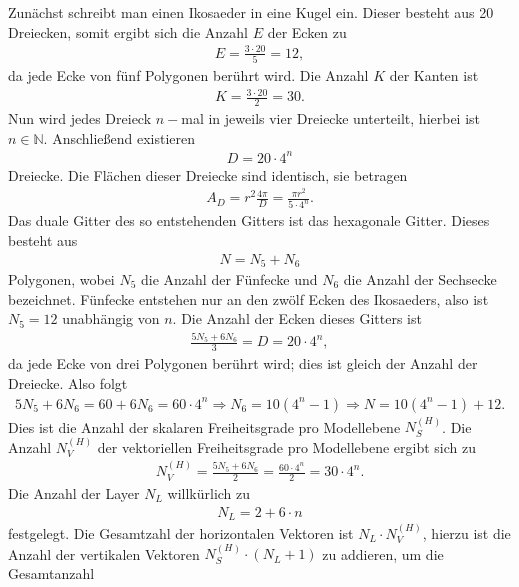 \documentclass{book}
\begin{document}
Zunächst schreibt man einen Ikosaeder in eine Kugel ein. Dieser besteht aus 20 Dreiecken, somit ergibt sich die Anzahl $E$ der Ecken zu
%
\begin{eqnarray}
E = \frac{3\cdot 20}{5} = 12, 
\end{eqnarray}
%
da jede Ecke von fünf Polygonen berührt wird. Die Anzahl $K$ der Kanten ist
%
\begin{eqnarray}
K = \frac{3\cdot 20}{2} = 30.
\end{eqnarray}
%
Nun wird jedes Dreieck $n-$mal in jeweils vier Dreiecke unterteilt, hierbei ist $n\in\mathbb{N}$. Anschließend existieren
%
\begin{eqnarray}
D = 20\cdot 4^n
\end{eqnarray}
%
Dreiecke. Die Flächen dieser Dreiecke sind identisch, sie betragen
%
\begin{eqnarray}
A_D = r^2\frac{4\pi}{D} = \frac{\pi r^2}{5\cdot 4^n}.
\end{eqnarray}
%
Das duale Gitter des so entstehenden Gitters ist das hexagonale Gitter. Dieses besteht aus
%
\begin{eqnarray}
N = N_5 + N_6
\end{eqnarray}
%
Polygonen, wobei $N_5$ die Anzahl der Fünfecke und $N_6$ die Anzahl der Sechsecke bezeichnet. Fünfecke entstehen nur an den zwölf Ecken des Ikosaeders, also ist $N_5 = 12$ unabhängig von $n$. Die Anzahl der Ecken dieses Gitters ist
%
\begin{eqnarray}
\frac{5N_5 + 6N_6}{3} = D = 20\cdot 4^n, 
\end{eqnarray}
%
da jede Ecke von drei Polygonen berührt wird; dies ist gleich der Anzahl der Dreiecke. Also folgt
%
\begin{eqnarray}
5N_5 + 6N_6 = 60 + 6N_6 = 60\cdot 4^n\Rightarrow N_6 = 10\left(4^n - 1\right)\Rightarrow N = 10\left(4^n - 1\right) + 12.
\end{eqnarray}
%
Dies ist die Anzahl der skalaren Freiheitsgrade pro Modellebene $N_S^{(H)}$. Die Anzahl $N_V^{(H)}$ der vektoriellen Freiheitsgrade pro Modellebene ergibt sich zu
%
\begin{eqnarray}
N_V^{(H)} = \frac{5N_5 + 6N_6}{2} = \frac{60\cdot 4^n}{2} = 30\cdot 4^n.
\end{eqnarray}
%
Die Anzahl der Layer $N_L$ willkürlich zu
%
\begin{eqnarray}
N_L = 2 + 6\cdot n
\end{eqnarray}
%
festgelegt. Die Gesamtzahl der horizontalen Vektoren ist $N_L\cdot N_V^{(H)}$, hierzu ist die Anzahl der vertikalen Vektoren $N_S^{(H)}\cdot\left(N_L + 1\right)$ zu addieren, um die Gesamtanzahl
\end{document}
